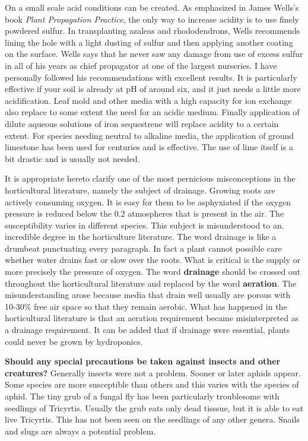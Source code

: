 On a small scale acid conditions can be created. As emphasized in James
Wells's book \textit{Plant Propagation Practice}, the only way to increase acidity is to use
finely powdered sulfur. In transplanting azaleas and rhododendrons, Wells
recommends lining the hole with a light dusting of sulfur and then applying another
coating on the surface. Wells says that he never saw any damage from use of excess
sulfur in all of his years as chief propagator at one of the largest nurseries. I have
personally followed his recommendations with excellent results. It is particularly
effective if your soil is already at pH of around six, and it just needs a little more
acidification. Leaf mold and other media with a high capacity for ion exchange also
replace to some extent the need for an acidic medium. Finally application of dilute
aqueous solutions of iron sequestrene will replace acidity to a certain extent.
For species needing neutral to alkaline media, the application of ground
limestone has been used for centuries and is effective. The use of lime itself is a bit
drastic and is usually not needed.

It is appropriate hereto clarify one of the most pernicious misconceptions in the
horticultural literature, namely the subject of drainage. Growing roots are actively
consuming oxygen. It is easy for them to be asphyxiated if the oxygen pressure is
reduced below the 0.2 atmospheres that is present in the air. The susceptibility varies
in different species. This subject is misunderstood to an. incredible degree in the
horticulture literature. The word drainage is like a drumbeat punctuating every
paragraph. In fact a plant cannot possible care whether water drains fast or slow over
the roots. What is critical is the supply or more precisely the pressure of oxygen. The
word \textbf{drainage} should be crossed out throughout the horticultural literature and
replaced by the word \textbf{aeration}. The misunderstanding arose because media that
drain well usually are porous with 10-30\% free air space so that they remain aerobic.
What has happened in the horticultural literature is that an aeration requirement
became misinterpreted as a drainage requirement. It can be added that if drainage
were essential, plants could never be grown by hydroponics.

\textbf{Should any special precautions be taken against insects and other
creatures?} Generally insects were not a problem. Sooner or later aphids appear.
Some species are more susceptible than others and this varies with the species of
aphid. The tiny grub of a fungal fly has been particularly troublesome with seedlings of
Tricyrtis. Usually the grub eats only dead tisssue, but it is able to eat live Tricyrtis. This
has not been seen on the seedlings of any other genera. Snails and slugs are always
a potential problem.


